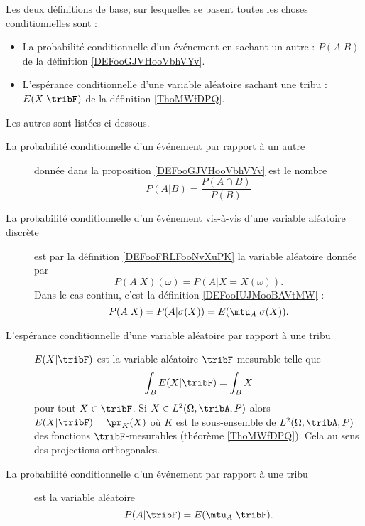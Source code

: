 
    Les deux définitions de base, sur lesquelles se basent toutes les choses conditionnelles sont :
    \begin{itemize}
        \item La probabilité conditionnelle d'un événement en sachant un autre : \( P(A|B)\) de la définition \ref{DEFooGJVHooVbhVYv}.
        \item L'espérance conditionnelle d'une variable aléatoire sachant une tribu : \( E(X|\tribF)\) de la définition \ref{ThoMWfDPQ}.
    \end{itemize}

    Les autres sont listées ci-dessous.
\begin{description}

    \item[La probabilité conditionnelle d'un événement par rapport à un autre] donnée dans la proposition \ref{DEFooGJVHooVbhVYv} est le nombre
\begin{equation}
    P(A|B)=\frac{ P(A\cap B) }{ P(B) }
\end{equation}

\item[La probabilité conditionnelle d'un événement vis-à-vis d'une variable aléatoire discrète] est par la définition \ref{DEFooFRLFooNvXuPK} la variable aléatoire donnée par
\begin{equation}
    P(A|X)(\omega)=P(A|X=X(\omega)).
\end{equation}
Dans le cas continu, c'est la définition \ref{DEFooIUJMooBAVtMW} :
\begin{equation}
    P(A|X)=P(A|\sigma(X))=E(\mtu_A|\sigma(X)).
\end{equation}

\item[L'espérance conditionnelle d'une variable aléatoire par rapport à une tribu] \( E(X|\tribF)\) est la variable aléatoire \( \tribF\)-mesurable telle que
\begin{equation}
    \int_BE(X|\tribF)=\int_BX
\end{equation}
pour tout \( X\in \tribF\). Si \( X\in L^2(\Omega,\tribA,P)\) alors \( E(X|\tribF)=\pr_K(X)\) où \( K\) est le sous-ensemble de \( L^2(\Omega,\tribA,P)\) des fonctions \( \tribF\)-mesurables (théorème \ref{ThoMWfDPQ}). Cela au sens des projections orthogonales.

\item[La probabilité conditionnelle d'un événement par rapport à une tribu] est la variable aléatoire
\begin{equation}
    P(A|\tribF)=E(\mtu_A|\tribF).
\end{equation}


\end{description}
